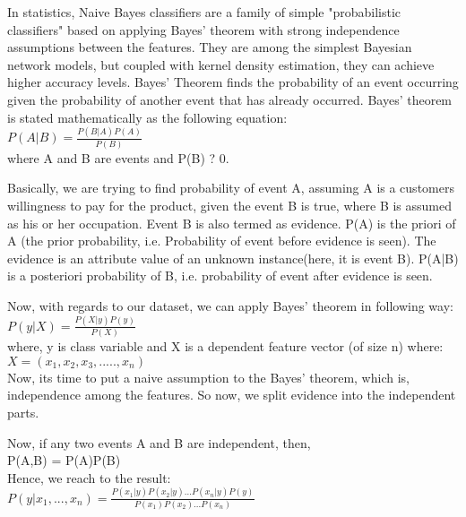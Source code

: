 \documentclass[conference]{IEEEtran}
\begin{document}
In statistics, Naive Bayes classifiers are a family of simple "probabilistic classifiers" based on applying Bayes' theorem with strong independence assumptions between the features. They are among the simplest Bayesian network models, but coupled with kernel density estimation, they can achieve higher accuracy levels.
Bayes’ Theorem finds the probability of an event occurring given the probability of another event that has already occurred. Bayes’ theorem is stated mathematically as the following equation:\\

$P(A|B) = \frac{P(B|A) P(A)}{P(B)}$\\

where A and B are events and P(B) ? 0.

    Basically, we are trying to find probability of event A, assuming A is a customers willingness to pay for the product, given the event B is true, where B is assumed as his or her occupation. Event B is also termed as evidence.
    P(A) is the priori of A (the prior probability, i.e. Probability of event before evidence is seen). The evidence is an attribute value of an unknown instance(here, it is event B).
    P(A|B) is a posteriori probability of B, i.e. probability of event after evidence is seen.

Now, with regards to our dataset, we can apply Bayes’ theorem in following way:\\

$P(y|X) = \frac{ P(X|y) P(y)}{P(X)}$\\

where, y is class variable and X is a dependent feature vector (of size n) where:\\

$X = (x_1,x_2,x_3,.....,x_n)$\\

Now, its time to put a naive assumption to the Bayes’ theorem, which is, independence among the features. So now, we split evidence into the independent parts.

Now, if any two events A and B are independent, then,\\

P(A,B) = P(A)P(B)\\

Hence, we reach to the result:\\

$P(y|x_1,...,x_n) = \frac{ P(x_1|y)P(x_2|y)...P(x_n|y)P(y)}{P(x_1)P(x_2)...P(x_n)}$\\
\end{document}
